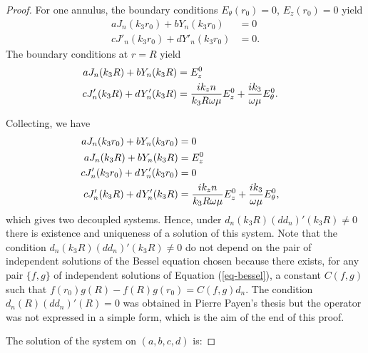 \documentclass[12pt,%
    twoside,%
    a4paper,%
    openright, %
    ]{book}
\numberwithin{equation}{section} %
\renewcommand{\frac}[2]{\dfrac{#1}{#2}} %
\begin{document}
\begin{proof}
            For one annulus, the boundary conditions  $E_{\theta}(r_0)=0$, $E_z(r_0)=0$ yield
            \begin{align*}
                a J_n(k_3r_0)+bY_n(k_3r_0)&=0
                \\
                cJ'_n(k_3r_0)+dY'_n(k_3r_0)&=0.
            \end{align*}
            The boundary conditions at $r=R$ yield
            \begin{align*}
                aJ_n(k_3R)+bY_n(k_3R) &= E_z^0
                \cr
                cJ'_n(k_3R)+dY'_n(k_3R) &= \frac{ik_zn}{k_3R\omega \mu}E^0_z+\frac{ik_3}{\omega \mu}E_{\theta}^0.
            \end{align*}

            Collecting, we have
            \begin{align*}
                a J_n(k_3r_0)+bY_n(k_3r_0)&=0
                \cr
                aJ_n(k_3R)+bY_n(k_3R)&= E_z^0
                \cr
                cJ'_n(k_3r_0)+dY'_n(k_3r_0)&=0
                \cr
                cJ'_n(k_3R)+dY'_n(k_3R)&= \frac{ik_zn}{k_3R\omega \mu}E^0_z+\frac{ik_3}{\omega \mu}E_{\theta}^0,
            \end{align*}
            which gives two decoupled systems.
            Hence, under $d_n(k_3R)(dd_n)'(k_3R)\not=0$ there is existence and uniqueness of a solution of this system.
            Note that the condition $d_n(k_3R)(dd_n)'(k_3R)\not=0$ do not depend on the pair of independent solutions of the Bessel equation chosen because there exists, for any pair $\{f,g\}$ of independent solutions of Equation (\ref{eq-bessel}), a constant $C(f,g)$ such that $f(r_0)g(R)-f(R)g(r_0)=C(f,g)d_n$.
            The condition $d_n(R)(dd_n)'(R)=0$ was obtained in Pierre Payen's thesis but the operator was not expressed in a simple form, which is the aim of the end of this proof.


            The solution of the system on $(a,b,c,d)$ is:


\end{proof}
\end{document}
